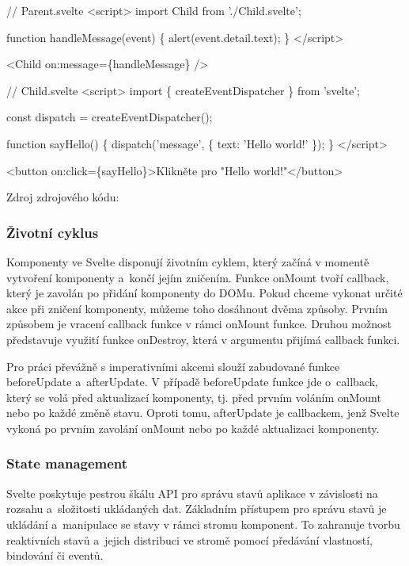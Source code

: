 \begin{prog}
// Parent.svelte
<script>
  import Child from './Child.svelte';

  function handleMessage(event) \{
    alert(event.detail.text);
  \}
</script>

<Child on:message=\{handleMessage\} />

// Child.svelte
<script>
  import \{ createEventDispatcher \} from 'svelte';

  const dispatch = createEventDispatcher();

  function sayHello() \{
    dispatch('message', \{
      text: 'Hello world!'
    \});
  \}
</script>

<button on:click=\{sayHello\}>Klikněte pro "Hello world!"</button>
\end{prog}

Zdroj zdrojového kódu: \cite{svelte}

\subsubsection{Životní cyklus}

Komponenty ve Svelte disponují životním cyklem, který začíná v momentě vytvoření komponenty a~končí jejím zničením. 
Funkce onMount tvoří callback, který je zavolán po přidání komponenty do DOMu. Pokud chceme vykonat určité akce při zničení komponenty, můžeme toho dosáhnout dvěma způsoby. 
Prvním způsobem je vracení callback funkce v rámci onMount funkce. Druhou možnost představuje využití funkce onDestroy, která v argumentu přijímá callback funkci. 

Pro práci převážně s imperativními akcemi slouží zabudované funkce beforeUpdate a~afterUpdate. 
V případě beforeUpdate funkce jde o~callback, který se volá před aktualizací komponenty, tj. před prvním voláním onMount nebo po každé změně stavu. 
Oproti tomu, afterUpdate je callbackem, jenž Svelte vykoná po prvním zavolání onMount nebo po každé aktualizaci komponenty.\cite{sveltehandbook,svelte}

\subsubsection{State management}

Svelte poskytuje pestrou škálu API pro správu stavů aplikace v závislosti na rozsahu a~složitosti ukládaných dat. 
Základním přístupem pro správu stavů je ukládání a~manipulace se stavy v rámci stromu komponent. 
To zahranuje tvorbu reaktivních stavů a~jejich distribuci ve stromě pomocí předávání vlastností, bindování či eventů. 

